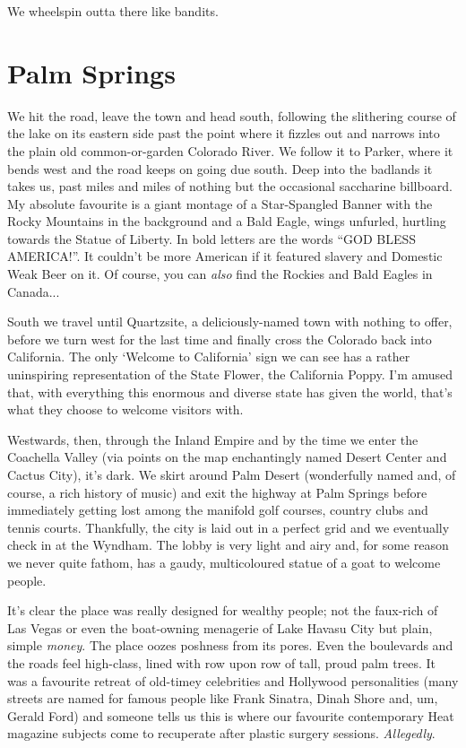 \documentclass[a5paper,titlepage,11pt]{book}
\begin{document}
We wheelspin outta there like bandits.

\section*{Palm Springs}
We hit the road, leave the town and head south, following the slithering course of the lake on its eastern side past the point where it fizzles out and narrows into the plain old common-or-garden Colorado River.  We follow it to Parker, where it bends west and the road keeps on going due south.  Deep into the badlands it takes us, past miles and miles of nothing but the occasional saccharine billboard.  My absolute favourite is a giant montage of a Star-Spangled Banner with the Rocky Mountains in the background and a Bald Eagle, wings unfurled, hurtling towards the Statue of Liberty.  In bold letters are the words ``GOD BLESS AMERICA!''.  It couldn't be more American if it featured slavery and Domestic Weak Beer on it.  Of course, you can \emph{also} find the Rockies and Bald Eagles in Canada...

South we travel until Quartzsite, a deliciously-named town with nothing to offer, before we turn west for the last time and finally cross the Colorado back into California.  The only `Welcome to California' sign we can see has a rather uninspiring representation of the State Flower, the California Poppy.  I'm amused that, with everything this enormous and diverse state has given the world, that's what they choose to welcome visitors with.

Westwards, then, through the Inland Empire and by the time we enter the Coachella Valley (via points on the map enchantingly named Desert Center and Cactus City), it's dark.  We skirt around Palm Desert (wonderfully named and, of course, a rich history of music) and exit the highway at Palm Springs before immediately getting lost among the manifold golf courses, country clubs and tennis courts.  Thankfully, the city is laid out in a perfect grid and we eventually check in at the Wyndham.  The lobby is very light and airy and, for some reason we never quite fathom, has a gaudy, multicoloured statue of a goat to welcome people.

It's clear the place was really designed for wealthy people; not the faux-rich of Las Vegas or even the boat-owning menagerie of Lake Havasu City but plain, simple \emph{money}.  The place oozes poshness from its pores.  Even the boulevards and the roads feel high-class, lined with row upon row of tall, proud palm trees.  It was a favourite retreat of old-timey celebrities and Hollywood personalities (many streets are named for famous people like Frank Sinatra, Dinah Shore and, um, Gerald Ford) and someone tells us this is where our favourite contemporary Heat magazine subjects come to recuperate after plastic surgery sessions.  \emph{Allegedly}.
\end{document}
